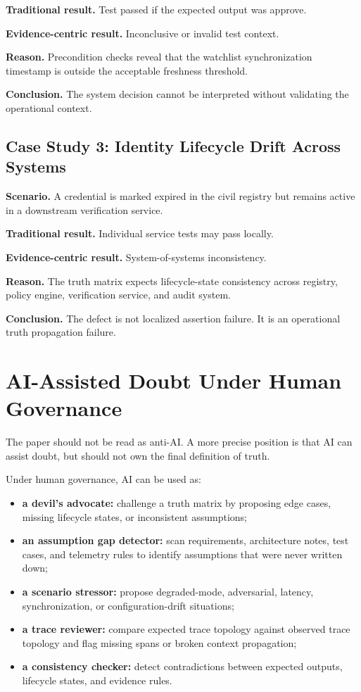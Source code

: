 \documentclass[11pt,a4paper]{article}
\begin{document}
\textbf{Traditional result.} Test passed if the expected output was approve.

\textbf{Evidence-centric result.} Inconclusive or invalid test context.

\textbf{Reason.} Precondition checks reveal that the watchlist synchronization timestamp is outside the acceptable freshness threshold.

\textbf{Conclusion.} The system decision cannot be interpreted without validating the operational context.

\subsection{Case Study 3: Identity Lifecycle Drift Across Systems}

\textbf{Scenario.} A credential is marked expired in the civil registry but remains active in a downstream verification service.

\textbf{Traditional result.} Individual service tests may pass locally.

\textbf{Evidence-centric result.} System-of-systems inconsistency.

\textbf{Reason.} The truth matrix expects lifecycle-state consistency across registry, policy engine, verification service, and audit system.

\textbf{Conclusion.} The defect is not localized assertion failure. It is an operational truth propagation failure.

\section{AI-Assisted Doubt Under Human Governance}

The paper should not be read as anti-AI. A more precise position is that AI can assist doubt, but should not own the final definition of truth.

Under human governance, AI can be used as:
\begin{itemize}
\item \textbf{a devil's advocate:} challenge a truth matrix by proposing edge cases, missing lifecycle states, or inconsistent assumptions;
\item \textbf{an assumption gap detector:} scan requirements, architecture notes, test cases, and telemetry rules to identify assumptions that were never written down;
\item \textbf{a scenario stressor:} propose degraded-mode, adversarial, latency, synchronization, or configuration-drift situations;
\item \textbf{a trace reviewer:} compare expected trace topology against observed trace topology and flag missing spans or broken context propagation;
\item \textbf{a consistency checker:} detect contradictions between expected outputs, lifecycle states, and evidence rules.
\end{itemize}
\end{document}

